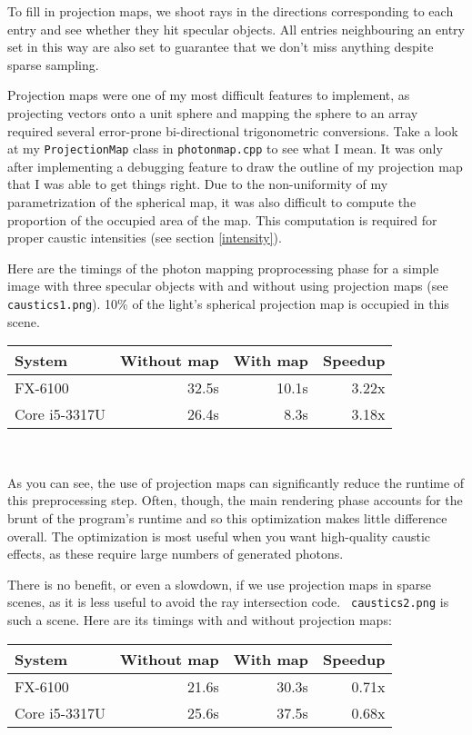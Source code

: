 \documentclass{article}
\begin{document}
To fill in projection maps, we shoot rays in the directions corresponding
to each entry and see whether they hit specular objects. All entries
neighbouring an entry set in this way are also set to guarantee that we don't
miss anything despite sparse sampling.

Projection maps were one of my most difficult features to implement, as projecting vectors onto a unit sphere and mapping the sphere to an array required several error-prone bi-directional trigonometric conversions. Take a look at my {\tt ProjectionMap} class in {\tt photonmap.cpp} to see what I mean. It was only after implementing a debugging feature to draw the outline of my projection map that I was able to get things right. Due to the non-uniformity of my parametrization of the spherical map, it was also difficult to compute the proportion of the occupied area of the map. This computation is required for proper caustic intensities (see section \ref{intensity}).

Here are the timings of the photon mapping proprocessing phase for a simple
image with three specular objects with and without using projection maps (see
{\tt caustics1.png}). 10\% of the light's spherical projection map is occupied
in this scene.

\begin{center}
\begin{tabular}{|l|r|r|r|} \hline
 System & Without map & With map & Speedup \\\hline
 FX-6100 & 32.5s & 10.1s & 3.22x \\\hline
 Core i5-3317U & 26.4s & 8.3s & 3.18x \\\hline
\end{tabular} \\
\end{center}

As you can see, the use of projection maps can significantly reduce the runtime
of this preprocessing step. Often, though, the main rendering phase accounts for
the brunt of the program's runtime and so this optimization makes little
difference overall. The optimization is most useful when you want high-quality
caustic effects, as these require large numbers of generated photons.

There is no benefit, or even a slowdown, if we use projection maps in sparse
scenes, as it is less useful to avoid the ray intersection code. {\tt
caustics2.png} is such a scene. Here are its timings with and without projection
maps:

\begin{center}
\begin{tabular}{|l|r|r|r|} \hline
 System & Without map & With map & Speedup \\\hline
       FX-6100 & 21.6s & 30.3s & 0.71x \\\hline
 Core i5-3317U & 25.6s & 37.5s & 0.68x \\\hline
\end{tabular} \\
\end{center}
\end{document}
